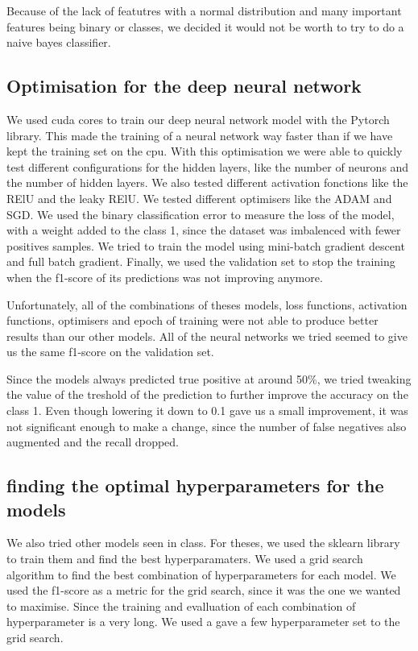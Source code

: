 \documentclass{article} %
\begin{document}
Because of the lack of featutres with a normal distribution and many important features being binary or classes,
we decided it would not be worth to try to do a naive bayes classifier.


\subsection{Optimisation for the deep neural network}
We used cuda cores to train our deep neural network model with the Pytorch library.
This made the training of a neural network way faster than if we have kept the training set on the cpu.
With this optimisation we were able to quickly test different configurations for the hidden layers,
like the number of neurons and the number of hidden layers.
We also tested different activation fonctions like the RElU and the leaky RElU.
We tested different optimisers like the ADAM and SGD.
We used the binary classification error to measure the loss of the model,
with a weight added to the class 1, since the dataset was imbalenced with fewer positives samples.
We tried to train the model using mini-batch gradient descent and full batch gradient.
Finally, we used the validation set to stop the training when the f1-score of its predictions was not improving anymore.


Unfortunately, all of the combinations of theses models, loss functions, activation functions, optimisers and epoch of training were not able to produce
better results than our other models. All of the neural networks we tried seemed to give us the same f1-score on the validation set.

Since the models always predicted true positive at around 50\%, we tried tweaking the value of the treshold
of the prediction to further improve the accuracy on the class 1. Even though lowering it down to 0.1 gave us a small improvement,
it was not significant enough to make a change, since the number of false negatives also augmented and the recall dropped.


\subsection{finding the optimal hyperparameters for the models}
We also tried other models seen in class. For theses, we used the sklearn library to train them and find
the best hyperparamaters. We used a grid search algorithm to find the best combination of hyperparameters
for each model. We used the f1-score as a metric for the grid search, since it was the one we wanted to maximise.
Since the training and evalluation of each combination of hyperparameter is a very long. We used a gave a few hyperparameter
set to the grid search. 
\end{document}
